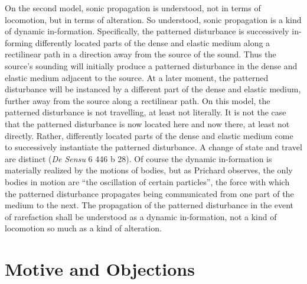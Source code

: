 \documentclass[12pt]{article}
\begin{document}
On the second model, sonic propagation is understood, not in terms of locomotion, but in terms of alteration. So understood, sonic propagation is a kind of dynamic in-formation. Specifically, the patterned disturbance is successively in-forming differently located parts of the dense and elastic medium along a rectilinear path in a direction away from the source of the sound. Thus the source's sounding will initially produce a patterned disturbance in the dense and elastic medium adjacent to the source. At a later moment, the patterned disturbance will be instanced by a different part of the dense and elastic medium, further away from the source along a rectilinear path. On this model, the patterned disturbance is not travelling, at least not literally. It is not the case that the patterned disturbance is now located here and now there, at least not directly. Rather, differently located parts of the dense and elastic medium come to successively instantiate the patterned disturbance. A change of state and travel are distinct (\emph{De Sensu} 6 446 b 28). Of course the dynamic in-formation is materially realized by the motions of bodies, but as Prichard observes, the only bodies in motion are ``the oscillation of certain particles'', the force with which the patterned disturbance propagates being communicated from one part of the medium to the next. The propagation of the patterned disturbance in the event of rarefaction shall be understood as a dynamic in-formation, not a kind of locomotion so much as a kind of alteration.


\section{Motive and Objections} %
\label{sec:motive_and_objections}
\end{document}
